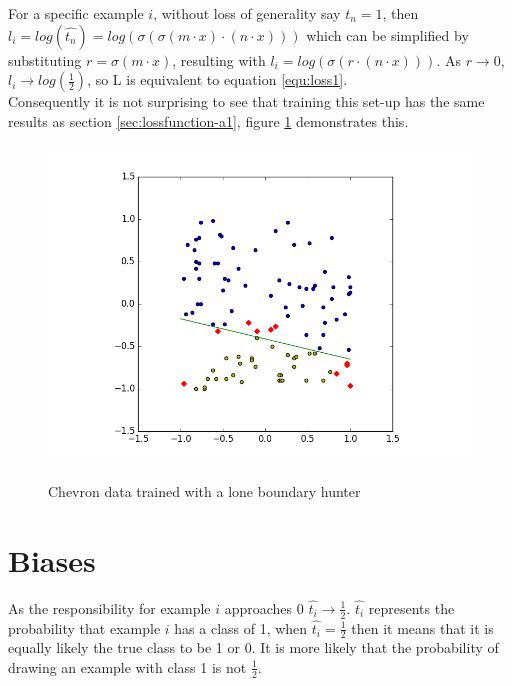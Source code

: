\documentclass[notitlepage]{report}
\theoremstyle{definition}
\begin{document}
For a specific example $i$, without loss of generality say $t_n = 1$, then $l_i = log(\widehat{t_n}) = log(\sigma(\sigma(m \cdot x) \cdot (n \cdot x)))$ which can be simplified by substituting $r = \sigma(m \cdot x)$, resulting with $l_i = log(\sigma(r \cdot (n \cdot x)))$. As $r \rightarrow 0$, $l_i \rightarrow log(\frac{1}{2})$, so L is equivalent to equation \ref{equ:loss1}.\\

Consequently it is not surprising to see that training this set-up has the same results as section \ref{sec:lossfunction-a1}, figure \ref{fig:CHEVData-SingleBH} demonstrates this. \\

\begin{figure}[H]
  \centering
  \begin{minipage}[b]{0.8\textwidth}
    \includegraphics[width=\textwidth]{CHEVData-SingleBH.png}
    \caption{}
    \label{fig:CHEVData-SingleBH}
  \end{minipage}
  \hfill

Chevron data trained with a lone boundary hunter
\end{figure}

\section{Biases}
As the responsibility for example $i$ approaches 0 $\widehat{t_i} \rightarrow \frac{1}{2}$. $\widehat{t_i}$ represents the probability that example $i$ has a class of 1, when $\widehat{t_i} = \frac{1}{2}$ then it means that it is equally likely the true class to be 1 or 0. It is more likely that the probability of drawing an example with class 1 is not $\frac{1}{2}$.\\
\end{document}
